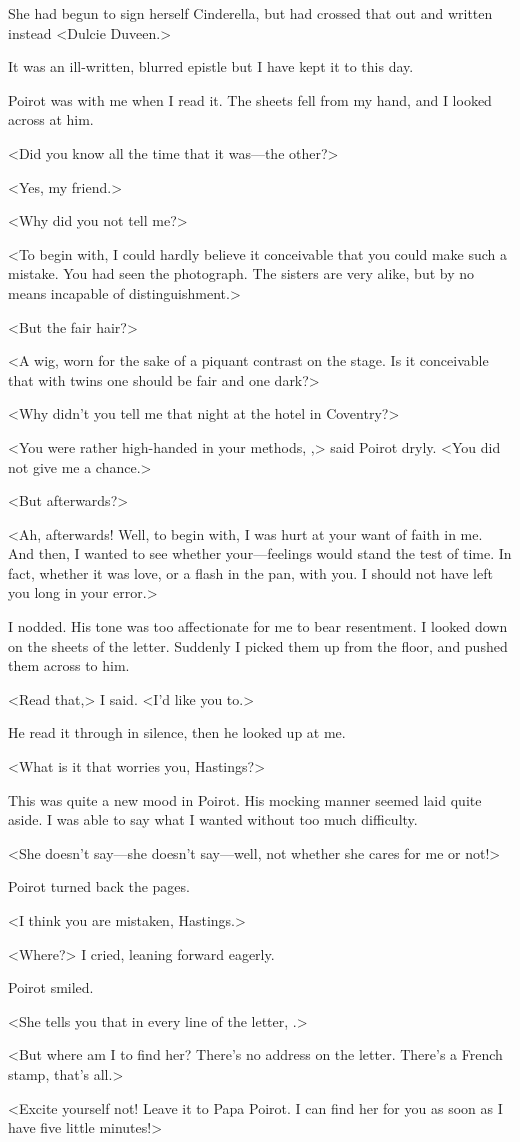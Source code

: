  She had begun to sign herself Cinderella, but had crossed that out and written instead <Dulcie Duveen.> 

 It was an ill-written, blurred epistle but I have kept it to this day. 

 Poirot was with me when I read it. The sheets fell from my hand, and I looked across at him. 

 <Did you know all the time that it was—the other?> 

 <Yes, my friend.> 

 <Why did you not tell me?> 

 <To begin with, I could hardly believe it conceivable that you could make such a mistake. You had seen the photograph. The sisters are very alike, but by no means incapable of distinguishment.> 

 <But the fair hair?> 

 <A wig, worn for the sake of a piquant contrast on the stage. Is it conceivable that with twins one should be fair and one dark?> 

 <Why didn't you tell me that night at the hotel in Coventry?> 

 <You were rather high-handed in your methods, ,> said Poirot dryly. <You did not give me a chance.> 

 <But afterwards?> 

 <Ah, afterwards! Well, to begin with, I was hurt at your want of faith in me. And then, I wanted to see whether your—feelings would stand the test of time. In fact, whether it was love, or a flash in the pan, with you. I should not have left you long in your error.> 

 I nodded. His tone was too affectionate for me to bear resentment. I looked down on the sheets of the letter. Suddenly I picked them up from the floor, and pushed them across to him. 

 <Read that,> I said. <I'd like you to.> 

 He read it through in silence, then he looked up at me. 

 <What is it that worries you, Hastings?> 

 This was quite a new mood in Poirot. His mocking manner seemed laid quite aside. I was able to say what I wanted without too much difficulty. 

 <She doesn't say—she doesn't say—well, not whether she cares for me or not!> 

 Poirot turned back the pages. 

 <I think you are mistaken, Hastings.> 

 <Where?> I cried, leaning forward eagerly. 

 Poirot smiled. 

 <She tells you that in every line of the letter, .> 

 <But where am I to find her? There's no address on the letter. There's a French stamp, that's all.> 

 <Excite yourself not! Leave it to Papa Poirot. I can find her for you as soon as I have five little minutes!>